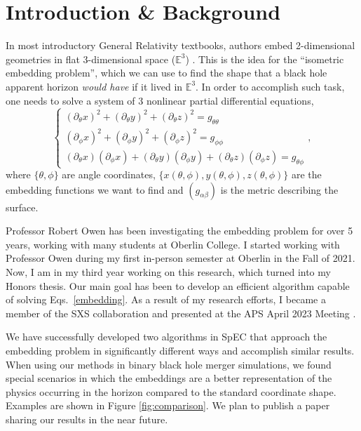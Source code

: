 \documentclass{../letter}
\newcommand{\E}{$\mathbb{E}^3$}
\newcommand{\eqs}[1]{Eqs.~\eqref{#1}}
\newcommand{\fig}[2][\empty]{Figure \hyperref[fig:#2]{\ref{fig:#2}#1}}
\begin{document}

	\section{Introduction \& Background}

	In most introductory General Relativity textbooks, authors embed 2-dimensional geometries in flat 3-dimensional space (\E) \cite[chapter 2]{hartle}. This is the idea for the ``isometric embedding problem'', which we can use to find the shape that a black hole apparent horizon \textit{would have} if it lived in \E. In order to accomplish such task, one needs to solve a system of 3 nonlinear partial differential equations,
	\begin{equation}\label{embedding}
		\begin{cases}
			(\partial_\theta x)^2 + (\partial_\theta y)^2 + (\partial_\theta z)^2 = g_{\theta\theta} \\
			(\partial_\phi x)^2 + (\partial_\phi y)^2 + (\partial_\phi z)^2 = g_{\phi\phi} \\
			(\partial_\theta x) (\partial_\phi x) + (\partial_\theta y) (\partial_\phi y) + (\partial_\theta z) (\partial_\phi z) = g_{\theta\phi}
		\end{cases},
	\end{equation}
	where $\{\theta, \phi\}$ are angle coordinates, $\{x(\theta,\phi), y(\theta,\phi), z(\theta,\phi)\}$ are the embedding functions we want to find and $(g_{\alpha\beta})$ is the metric describing the surface.

	Professor Robert Owen has been investigating the embedding problem for over 5 years, working with many students at Oberlin College. I started working with Professor Owen during my first in-person semester at Oberlin in the Fall of 2021. Now, I am in my third year working on this research, which turned into my Honors thesis. Our main goal has been to develop an efficient algorithm capable of solving \eqs{embedding}. As a result of my research efforts, I became a member of the SXS collaboration and presented at the APS April 2023 Meeting \cite{APS_poster}.

	We have successfully developed two algorithms in SpEC \cite{SpEC} that approach the embedding problem in significantly different ways and accomplish similar results. When using our methods in binary black hole merger simulations, we found special scenarios in which the embeddings are a better representation of the physics occurring in the horizon compared to the standard coordinate shape. Examples are shown in \fig{comparison}. We plan to publish a paper sharing our results in the near future.
\end{document}
